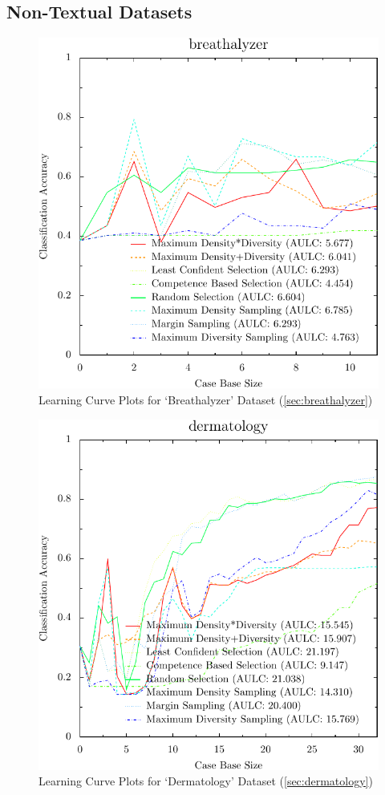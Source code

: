 \documentclass[a4paper,11pt]{report}
\begin{document}
\subsection{Non-Textual Datasets}

\begin{figure}[h!]
\includegraphics{./Plots/breathalyzer}
\caption{Learning Curve Plots for `Breathalyzer' Dataset (\ref{sec:breathalyzer})}
\end{figure}

\begin{figure}[h!]
\includegraphics{./Plots/dermatology}
\caption{Learning Curve Plots for `Dermatology' Dataset (\ref{sec:dermatology})}
\end{figure}
\end{document}
